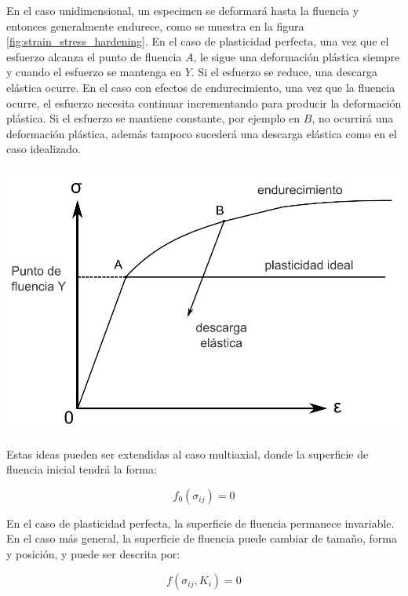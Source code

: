 En el caso unidimensional, un especimen se deformará hasta la fluencia y entonces generalmente 
endurece, como se muestra en la figura \ref{fig:strain_stress_hardening}. En el caso de 
plasticidad perfecta, una vez que el esfuerzo alcanza el punto de fluencia $A$, le sigue una 
deformación plástica siempre y cuando el esfuerzo se mantenga en $Y$. Si el esfuerzo se reduce, 
una descarga elástica ocurre. En el caso con efectos de endurecimiento, una vez que la fluencia 
ocurre, el esfuerzo necesita continuar incrementando para producir la deformación plástica. 
Si el esfuerzo se mantiene constante, por ejemplo en $B$, no ocurrirá una deformación plástica, 
además tampoco sucederá una descarga elástica como en el caso idealizado. ~\cite{kelly2012}

\begin{center}
\includegraphics[scale=0.6]{src/ch2/strain_stress_hardening}
\label{fig:strain_stress_hardening}
\end{center}


Estas ideas pueden ser extendidas al caso multiaxial, donde la superficie de fluencia inicial 
tendrá la forma:

\begin{equation}
f_0 (\sigma_{ij}) = 0
\end{equation}

En el caso de plasticidad perfecta, la superficie de fluencia permanece invariable. En el caso 
más general, la superficie de fluencia puede cambiar de tamaño, forma y posición, y puede ser 
descrita por:

\begin{equation}
f(\sigma_{ij}, K_i) = 0
\end{equation}

